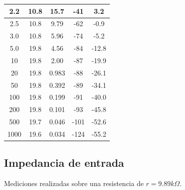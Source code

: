\documentclass[../../tc_tp3_main.tex]{subfiles}
\begin{document}
\begin{table}[H]
\begin{tabular}{|c|c|c|c|c|}
2.2      & 10.8               & 15.7                & -41                   & 3.2             \\ \hline
2.5      & 10.8               & 9.79                & -62                   & -0.9            \\ \hline
3.0      & 10.8               & 5.96                & -74                   & -5.2            \\ \hline
5.0      & 19.8               & 4.56                & -84                   & -12.8           \\ \hline
10       & 19.8               & 2.00                & -87                   & -19.9           \\ \hline
20       & 19.8               & 0.983               & -88                   & -26.1           \\ \hline
50       & 19.8               & 0.392               & -89                   & -34.1           \\ \hline
100      & 19.8               & 0.199               & -91                   & -40.0           \\ \hline
200      & 19.8               & 0.101               & -93                   & -45.8           \\ \hline
500      & 19.7               & 0.046               & -101                  & -52.6           \\ \hline
1000     & 19.6               & 0.034               & -124                  & -55.2           \\ \hline
\end{tabular}
\end{table}

\newpage

\subsection{Impedancia de entrada}

Mediciones realizadas sobre una resistencia de $r = 9.89k\Omega$.
\end{document}
